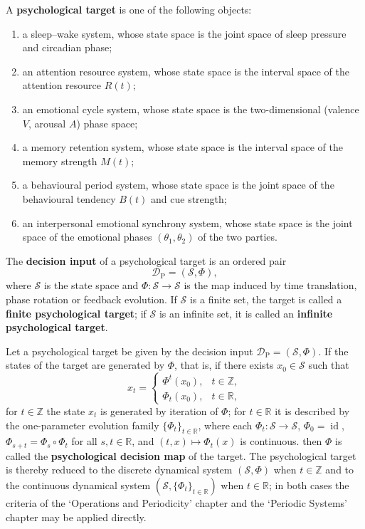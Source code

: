 \begin{definition}\label{def:psych_target}
A \textbf{psychological target} is one of the following objects:
\begin{enumerate}[label=(\roman*)]
    \item a sleep--wake system, whose state space is the joint space of sleep pressure and circadian phase;
    \item an attention resource system, whose state space is the interval space of the attention resource $R(t)$;
    \item an emotional cycle system, whose state space is the two-dimensional (valence $V$, arousal $A$) phase space;
    \item a memory retention system, whose state space is the interval space of the memory strength $M(t)$;
    \item a behavioural period system, whose state space is the joint space of the behavioural tendency $B(t)$ and cue strength;
    \item an interpersonal emotional synchrony system, whose state space is the joint space of the emotional phases $(\theta_1,\theta_2)$ of the two parties.
\end{enumerate}
The \textbf{decision input} of a psychological target is an ordered pair
\[
\mathcal D_{\mathrm{P}}=(\mathcal S,\Phi),
\]
where $\mathcal S$ is the state space and $\Phi:\mathcal S\to\mathcal S$ is the map induced by time translation, phase rotation or feedback evolution. If $\mathcal S$ is a finite set, the target is called a \textbf{finite psychological target}; if $\mathcal S$ is an infinite set, it is called an \textbf{infinite psychological target}.
\end{definition}

\begin{definition}\label{def:psych_periodization}
Let a psychological target be given by the decision input $\mathcal D_{\mathrm{P}}=(\mathcal S,\Phi)$. If the states of the target are generated by $\Phi$, that is, if there exists $x_0\in\mathcal S$ such that
\[
x_t=\begin{cases}\Phi^t(x_0), & t\in\mathbb Z,\\ \Phi_t(x_0), & t\in\mathbb R,\end{cases}
\]
for $t\in\mathbb Z$ the state $x_t$ is generated by iteration of $\Phi$; for $t\in\mathbb R$ it is described by the one-parameter evolution family $\{\Phi_t\}_{t\in\mathbb R}$, where each $\Phi_t:\mathcal S\to\mathcal S$, $\Phi_0=\operatorname{id}$, $\Phi_{s+t}=\Phi_s\circ\Phi_t$ for all $s,t\in\mathbb R$, and $(t,x)\mapsto\Phi_t(x)$ is continuous.
then $\Phi$ is called the \textbf{psychological decision map} of the target. The psychological target is thereby reduced to the discrete dynamical system $(\mathcal S,\Phi)$ when $t\in\mathbb Z$ and to the continuous dynamical system $(\mathcal S,\{\Phi_t\}_{t\in\mathbb R})$ when $t\in\mathbb R$; in both cases the criteria of the `Operations and Periodicity' chapter and the `Periodic Systems' chapter may be applied directly.
\end{definition}

